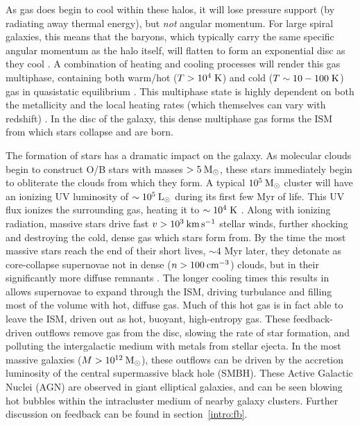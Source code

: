 As gas does begin to cool within these halos, it will lose pressure support (by
radiating away thermal energy), but {\it not} angular momentum.  For large
spiral galaxies, this means that the baryons, which typically carry the same
specific angular momentum as the halo itself, will flatten to form an
exponential disc as they cool \citep{Fall1980,Mo1998}.    A combination
of heating and cooling processes will render this gas multiphase, containing
both warm/hot ($T>10^4\;\rm{K}$) and cold ($T\sim10-100\;\rm{K}$) gas in
quasistatic equilibrium \citep{McKee1977}.  This multiphase state is highly
dependent on both the metallicity and the local heating rates (which
themselves can vary with redshift) \citep{Field1969,Wolfire1995,Norman1997}.  In
the disc of the galaxy, this dense multiphase gas forms the ISM from which stars
collapse and are born.

The formation of stars has a dramatic impact on the galaxy.  As molecular clouds
begin to construct O/B stars with masses $>5\>{\rm M_{\odot}}$, these stars immediately
begin to obliterate the clouds from which they form.  A typical $10^5\>{\rm M_{\odot}}$
cluster will have an ionizing UV luminosity of $\sim10^5\>{\rm L_{\odot}}$ during its first
few Myr of life.  This UV flux ionizes the surrounding gas, heating it to
$\sim10^4\;\rm{K}$ \citep{Dale2005,Murray2011}.  Along with ionizing radiation,
massive stars drive fast $v>10^3\>{\rm km}\,{\rm s}^{-1}$ stellar winds, further shocking and
destroying the cold, dense gas which stars form from.  By the time the most
massive stars reach the end of their short lives, $\sim4$ Myr later, they
detonate as core-collapse supernovae not in dense ($n>100\>{\rm cm^{-3}}$) clouds, but in
their significantly more diffuse remnants \citep{Rogers2013}.  The longer
cooling times this results in allows supernovae to expand through the ISM,
driving turbulance \citep{Ostriker2010} and filling most of the volume with hot,
diffuse gas.  Much of this hot gas is in fact able to leave the ISM, driven out
as hot, buoyant, high-entropy gas.  These feedback-driven outflows remove gas
from the disc, slowing the rate of star formation, and polluting the
intergalactic medium with metals from stellar ejecta.  In the most massive
galaxies ($M>10^{12}\>{\rm M_{\odot}}$), these outflows can be driven by the accretion
luminosity of the central supermassive black hole (SMBH).  These Active Galactic
Nuclei (AGN) are observed in giant elliptical galaxies, and can be seen blowing
hot bubbles within the intracluster medium of nearby galaxy clusters.  Further
discussion on feedback can be found in section~\ref{intro:fb}.

